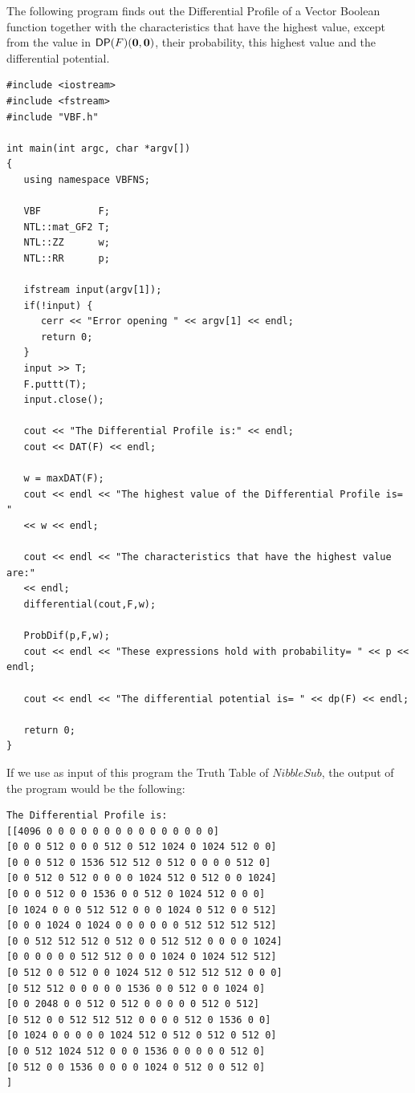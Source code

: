 \begin{example}
The following program finds out the Differential Profile of a Vector Boolean function together with the characteristics that have the highest value, except from the value in $\matr{DP}(F)(\vec{0},\vec{0})$, their probability, this highest value and the differential potential.

\begin{verbatim}
#include <iostream>
#include <fstream>
#include "VBF.h"

int main(int argc, char *argv[])
{
   using namespace VBFNS;

   VBF          F;
   NTL::mat_GF2 T;
   NTL::ZZ      w;
   NTL::RR      p;

   ifstream input(argv[1]);
   if(!input) {
      cerr << "Error opening " << argv[1] << endl;
      return 0;
   }
   input >> T;
   F.puttt(T);
   input.close();

   cout << "The Differential Profile is:" << endl;
   cout << DAT(F) << endl;

   w = maxDAT(F);
   cout << endl << "The highest value of the Differential Profile is= " 
   << w << endl;

   cout << endl << "The characteristics that have the highest value are:" 
   << endl;
   differential(cout,F,w);

   ProbDif(p,F,w);
   cout << endl << "These expressions hold with probability= " << p << endl;

   cout << endl << "The differential potential is= " << dp(F) << endl;

   return 0;
}
\end{verbatim}

If we use as input of this program the Truth Table of $NibbleSub$, the output of the program would be the following:

\begin{verbatim}
The Differential Profile is:
[[4096 0 0 0 0 0 0 0 0 0 0 0 0 0 0 0]
[0 0 0 512 0 0 0 512 0 512 1024 0 1024 512 0 0]
[0 0 0 512 0 1536 512 512 0 512 0 0 0 0 512 0]
[0 0 512 0 512 0 0 0 0 1024 512 0 512 0 0 1024]
[0 0 0 512 0 0 1536 0 0 512 0 1024 512 0 0 0]
[0 1024 0 0 0 512 512 0 0 0 1024 0 512 0 0 512]
[0 0 0 1024 0 1024 0 0 0 0 0 0 512 512 512 512]
[0 0 512 512 512 0 512 0 0 512 512 0 0 0 0 1024]
[0 0 0 0 0 0 512 512 0 0 0 1024 0 1024 512 512]
[0 512 0 0 512 0 0 1024 512 0 512 512 512 0 0 0]
[0 512 512 0 0 0 0 0 1536 0 0 512 0 0 1024 0]
[0 0 2048 0 0 512 0 512 0 0 0 0 0 512 0 512]
[0 512 0 0 512 512 512 0 0 0 0 512 0 1536 0 0]
[0 1024 0 0 0 0 0 1024 512 0 512 0 512 0 512 0]
[0 0 512 1024 512 0 0 0 1536 0 0 0 0 0 512 0]
[0 512 0 0 1536 0 0 0 0 1024 0 512 0 0 512 0]
]


\end{verbatim}
\end{example}
